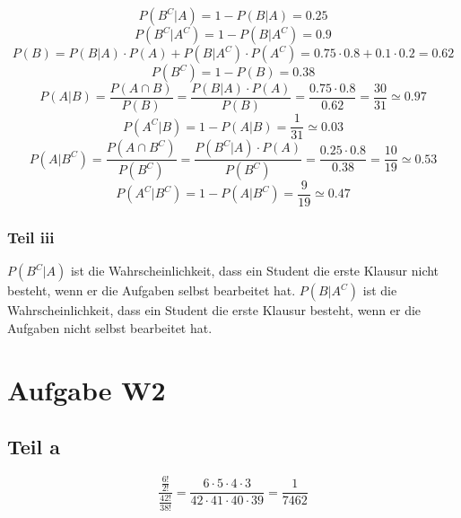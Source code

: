 \documentclass[10pt,a4paper]{article}
\begin{document}
\begin{equation}
  P(B^{C} | A) = 1 - P(B | A) = 0.25
\end{equation}
\begin{equation}
  P(B^{C} | A^{C}) = 1 - P(B | A^{C}) = 0.9
\end{equation}
\begin{equation}
  P(B) = P(B | A) \cdot P(A) + P(B | A^{C}) \cdot P(A^{C}) = 0.75 \cdot 0.8 + 0.1 \cdot 0.2 = 0.62
\end{equation}
\begin{equation}
  P(B^{C}) = 1 - P(B) = 0.38
\end{equation}
\begin{equation}
  P(A | B) = \frac{P(A \cap B)}{P(B)} = \frac{P(B | A) \cdot P(A)}{P(B)} = \frac{0.75 \cdot 0.8}{0.62} = \frac{30}{31} \simeq 0.97
\end{equation}
\begin{equation}
  P(A^{C} | B) = 1 - P(A | B) = \frac{1}{31} \simeq 0.03
\end{equation}
\begin{equation}
  P(A | B^{C}) = \frac{P(A \cap B^{C})}{P(B^{C})} = \frac{P(B^{C} | A) \cdot P(A)}{P(B^{C})} = \frac{0.25 \cdot 0.8}{0.38} = \frac{10}{19} \simeq 0.53
\end{equation}
\begin{equation}
  P(A^{C} | B^{C}) = 1 - P(A | B^{C}) = \frac{9}{19} \simeq 0.47
\end{equation}

\subsubsection{Teil iii}

$P(B^{C} | A)$ ist die Wahrscheinlichkeit, dass ein Student die erste Klausur nicht besteht, wenn er die Aufgaben selbst bearbeitet hat.
$P(B | A^{C})$ ist die Wahrscheinlichkeit, dass ein Student die erste Klausur besteht, wenn er die Aufgaben nicht selbst bearbeitet hat.

\section{Aufgabe W2}

\subsection{Teil a}
\begin{equation}
  \frac{\frac{6!}{2!}}{\frac{42!}{38!}} = \frac{6 \cdot 5 \cdot 4 \cdot 3}{42 \cdot 41 \cdot 40 \cdot 39} = \frac{1}{7462}
\end{equation}
\end{document}
